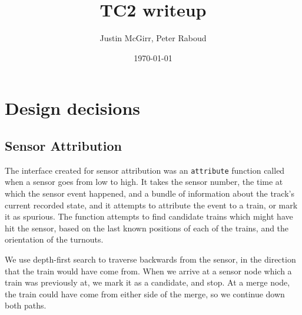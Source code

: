 \documentclass{article}
\title{TC2 writeup}
\author{Justin McGirr, Peter Raboud}
\date{\today}
\begin{document}
\maketitle

\section{Design decisions}


\subsection{Sensor Attribution}
The interface created for sensor attribution was an \texttt{attribute} function called when a sensor goes from low to high.
It takes the sensor number, the time at which the sensor event happened, and a bundle of information about the track's current
recorded state, and it attempts to attribute the event to a train, or mark it as spurious.
The function attempts to find candidate trains which might have hit the sensor, based on the last
known positions of each of the trains, and the orientation of the turnouts.

We use depth-first search to traverse backwards from the sensor, in the direction that the train would have come from.
When we arrive at a sensor node which a train was previously at, we mark it as a candidate, and stop.
At a merge node, the train could have come from either side of the merge, so we continue down both
paths.
\end{document}
